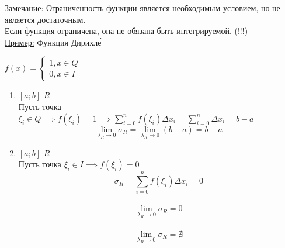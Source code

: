 \documentclass[12pt]{article}
\begin{document}
    \underline{Замечание:} Ограниченность функции является необходимым условием, но не является достаточным.\\
    Если функция ограничена, она не обязана быть интегрируемой. (!!!)\\
    \underline{Пример:} Функция Дирихле́\\
    \begin{adjustwidth}{1.5em}{1.5em}
        $f(x) = \begin{cases}
            1,x \in Q\\
            0,x \in I
        \end{cases}$
        \begin{enumerate}
            \item $[a;b]$ $R$\\
            Пусть точка $\xi_i \in Q \implies f(\xi_i) = 1 \implies \sum_{i=0}^{n} f(\xi_i) \Delta x_i =
            \sum_{i=0}^{n} \Delta x_i = b-a$\\
            \[\lim_{\lambda_R \to 0} \sigma_R = \lim_{\lambda_R \to 0} (b-a) = b-a\]
            \item $[a;b]$ $R$\\
            Пусть точка $\xi_i \in I \implies f(\xi_i)=0$\\
            \[\sigma_R = \sum_{i=0}^{n} f(\xi_i) \Delta x_i =0\]\\
            \[\lim_{\lambda_R \to 0} \sigma_R = 0\]\\
            \[\lim_{\lambda_R \to 0} \sigma_R = \nexists\]
        \end{enumerate}
    \end{adjustwidth}
\end{document}
